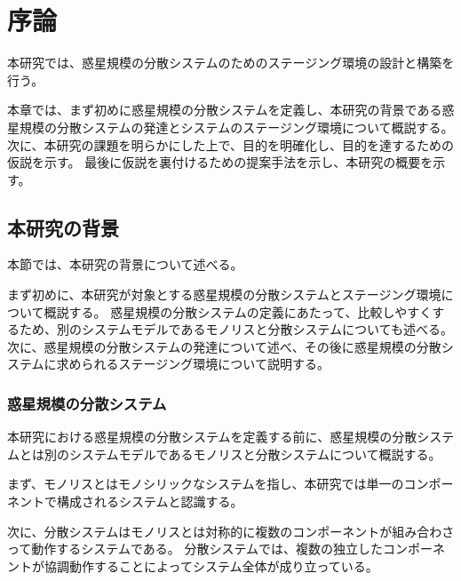 \chapter{序論}
\label{introduction}

本研究では、惑星規模の分散システムのためのステージング環境の設計と構築を行う。

本章では、まず初めに惑星規模の分散システムを定義し、本研究の背景である惑星規模の分散システムの発達とシステムのステージング環境について概説する。
次に、本研究の課題を明らかにした上で、目的を明確化し、目的を達するための仮説を示す。
最後に仮説を裏付けるための提案手法を示し、本研究の概要を示す。

\section{本研究の背景}
\label{introduction:background}

本節では、本研究の背景について述べる。

まず初めに、本研究が対象とする惑星規模の分散システムとステージング環境について概説する。
惑星規模の分散システムの定義にあたって、比較しやすくするため、別のシステムモデルであるモノリスと分散システムについても述べる。
次に、惑星規模の分散システムの発達について述べ、その後に惑星規模の分散システムに求められるステージング環境について説明する。

\subsection{惑星規模の分散システム}

本研究における惑星規模の分散システムを定義する前に、惑星規模の分散システムとは別のシステムモデルであるモノリスと分散システムについて概説する。

まず、モノリスとはモノシリックなシステムを指し、本研究では単一のコンポーネントで構成されるシステムと認識する。

次に、分散システムはモノリスとは対称的に複数のコンポーネントが組み合わさって動作するシステムである。
分散システムでは、複数の独立したコンポーネントが協調動作することによってシステム全体が成り立っている。

